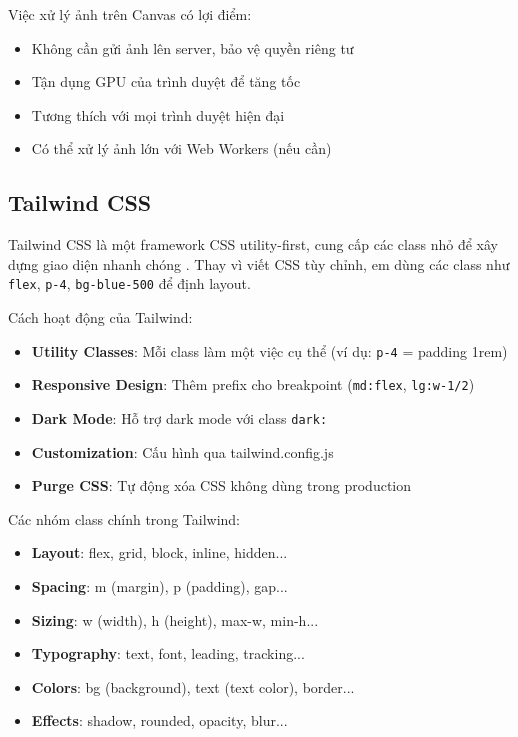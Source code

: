\documentclass[14pt,a4paper,oneside]{report}
\begin{document}
Việc xử lý ảnh trên Canvas có lợi điểm:
\begin{itemize}
  \item Không cần gửi ảnh lên server, bảo vệ quyền riêng tư
  \item Tận dụng GPU của trình duyệt để tăng tốc
  \item Tương thích với mọi trình duyệt hiện đại
  \item Có thể xử lý ảnh lớn với Web Workers (nếu cần)
\end{itemize}

\subsection{Tailwind CSS}
Tailwind CSS là một framework CSS utility-first, cung cấp các class nhỏ để xây dựng giao diện nhanh chóng \cite{tailwind}. Thay vì viết CSS tùy chỉnh, em dùng các class như \texttt{flex}, \texttt{p-4}, \texttt{bg-blue-500} để định layout.

Cách hoạt động của Tailwind:
\begin{itemize}
  \item \textbf{Utility Classes}: Mỗi class làm một việc cụ thể (ví dụ: \texttt{p-4} = padding 1rem)
  \item \textbf{Responsive Design}: Thêm prefix cho breakpoint (\texttt{md:flex}, \texttt{lg:w-1/2})
  \item \textbf{Dark Mode}: Hỗ trợ dark mode với class \texttt{dark:}
  \item \textbf{Customization}: Cấu hình qua tailwind.config.js
  \item \textbf{Purge CSS}: Tự động xóa CSS không dùng trong production
\end{itemize}

Các nhóm class chính trong Tailwind:
\begin{itemize}
  \item \textbf{Layout}: flex, grid, block, inline, hidden...
  \item \textbf{Spacing}: m (margin), p (padding), gap...
  \item \textbf{Sizing}: w (width), h (height), max-w, min-h...
  \item \textbf{Typography}: text, font, leading, tracking...
  \item \textbf{Colors}: bg (background), text (text color), border...
  \item \textbf{Effects}: shadow, rounded, opacity, blur...
\end{itemize}
\end{document}
